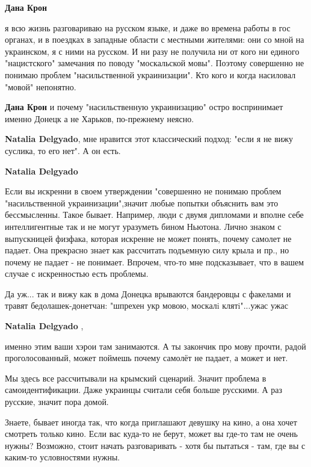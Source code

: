 \begin{itemize}
\begin{itemize}
\textbf{Дана Крон} 

я всю жизнь разговариваю на русском языке, и даже во времена работы в гос
органах, и в поездках в западные области с местными жителями: они со мной на
украинском, я с ними на русском. И ни разу не получила ни от кого ни единого
"нацистского" замечания по поводу "москальской мовы". Поэтому совершенно не
понимаю проблем "насильственной украинизации". Кто кого и когда насиловал
"мовой" непонятно.

\textbf{Дана Крон} и почему "насильственную украинизацию" остро воспринимает именно Донецк а не Харьков, по-прежнему неясно.

\textbf{Natalia Delgyado}, мне нравится этот классический подход: "если я не вижу суслика, то его нет". А он есть.

\textbf{Natalia Delgyado} 

Если вы искренни в своем утверждении "совершенно не понимаю проблем
"насильственной украинизации",значит любые попытки объяснить вам это
бессмысленны. Такое бывает. Например, люди с двумя дипломами и вполне себе
интеллигентные так и не могут уразуметь бином Ньютона. Лично знаком с
выпускницей физфака, которая искренне не может понять, почему самолет не падает.
Она прекрасно знает как рассчитать подъемную силу крыла и пр., но почему не
падает - не понимает. Впрочем, что-то мне подсказывает, что в вашем случае с
искренностью есть проблемы.


Да уж... так и вижу как в дома Донецка врываются бандеровцы с факелами и травят
бедолашек-донетчан: "шпрехен укр мовою, москалi клятi"...ужас ужас

\textbf{Natalia Delgyado} , 

именно этим ваши хэрои там занимаются. А ты закончик про мову прочти, радой
проголосованный, может поймешь почему самолёт не падает, а может и нет.

\end{itemize} %


Мы здесь все рассчитывали на крымский сценарий. Значит проблема в
самоидентификации. Даже украинцы считали себя больше русскими. А раз
русские, значит пора домой.

\begin{itemize} %

Знаете, бывает иногда так, что когда приглашают девушку на кино, а она хочет
смотреть только кино. Если вас куда-то не берут, может вы где-то там не очень
нужны? Возможно, стоит начать разговаривать - хотя бы пытаться - там, где вы с
каким-то условностями нужны.


\end{itemize}
\end{itemize}
